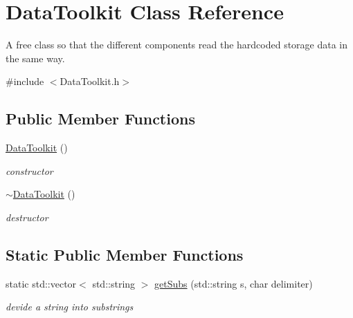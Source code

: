 \hypertarget{class_data_toolkit}{}\section{Data\+Toolkit Class Reference}
\label{class_data_toolkit}


A free class so that the different components read the hardcoded storage data in the same way.  




{\ttfamily \#include $<$Data\+Toolkit.\+h$>$}

\subsection*{Public Member Functions}
\begin{DoxyCompactItemize}
\item 
\mbox{\label{class_data_toolkit_a39d726a65375adc2d7fea7ec05866f75}} 
\mbox{\hyperlink{class_data_toolkit_a39d726a65375adc2d7fea7ec05866f75}{Data\+Toolkit}} ()
\begin{DoxyCompactList}\small\item\em constructor \end{DoxyCompactList}\item 
\mbox{\label{class_data_toolkit_aa792776c124aaf39bde19cb57bfcab38}} 
\mbox{\hyperlink{class_data_toolkit_aa792776c124aaf39bde19cb57bfcab38}{$\sim$\+Data\+Toolkit}} ()
\begin{DoxyCompactList}\small\item\em destructor \end{DoxyCompactList}\end{DoxyCompactItemize}
\subsection*{Static Public Member Functions}
\begin{DoxyCompactItemize}
\item 
\mbox{\label{class_data_toolkit_aca86f00861be433066ed7d5f3962c387}} 
static std\+::vector$<$ std\+::string $>$ \mbox{\hyperlink{class_data_toolkit_aca86f00861be433066ed7d5f3962c387}{get\+Subs}} (std\+::string s, char delimiter)
\begin{DoxyCompactList}\small\item\em devide a string into substrings \end{DoxyCompactList}\end{DoxyCompactItemize}


